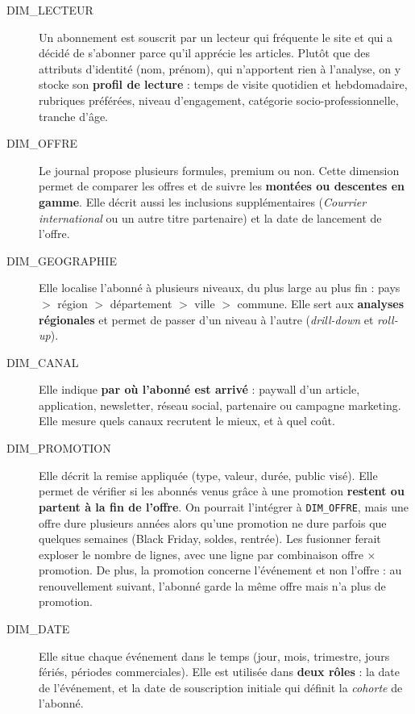\documentclass[a4paper,12pt]{article}
\begin{document}
\begin{description}

  \item[DIM\_LECTEUR] Un abonnement est souscrit par un lecteur qui fréquente
  le site et qui a décidé de s'abonner parce qu'il apprécie les articles.
  Plutôt que des attributs d'identité (nom, prénom), qui n'apportent rien à
  l'analyse, on y stocke son \textbf{profil de lecture} : temps de visite
  quotidien et hebdomadaire, rubriques préférées, niveau d'engagement,
  catégorie socio-professionnelle, tranche d'âge.

  \item[DIM\_OFFRE] Le journal propose plusieurs formules, premium ou non.
  Cette dimension permet de comparer les offres et de suivre les
  \textbf{montées ou descentes en gamme}. Elle décrit aussi les inclusions
  supplémentaires (\emph{Courrier international} ou un autre titre partenaire)
  et la date de lancement de l'offre.

  \item[DIM\_GEOGRAPHIE] Elle localise l'abonné à plusieurs niveaux, du plus
  large au plus fin : pays $>$ région $>$ département $>$ ville $>$ commune.
  Elle sert aux \textbf{analyses régionales} et permet de passer d'un niveau
  à l'autre (\emph{drill-down} et \emph{roll-up}).

  \item[DIM\_CANAL] Elle indique \textbf{par où l'abonné est arrivé} :
  paywall d'un article, application, newsletter, réseau social, partenaire
  ou campagne marketing. Elle mesure quels canaux recrutent le mieux,
  et à quel coût.

  \item[DIM\_PROMOTION] Elle décrit la remise appliquée (type, valeur, durée,
  public visé). Elle permet de vérifier si les abonnés venus grâce à une
  promotion \textbf{restent ou partent à la fin de l'offre}.
  On pourrait l'intégrer à \texttt{DIM\_OFFRE}, mais une offre dure plusieurs
  années alors qu'une promotion ne dure parfois que quelques semaines
  (Black Friday, soldes, rentrée). Les fusionner ferait exploser le nombre
  de lignes, avec une ligne par combinaison offre $\times$ promotion.
  De plus, la promotion concerne l'événement et non l'offre : au
  renouvellement suivant, l'abonné garde la même offre mais n'a plus de
  promotion.

  \item[DIM\_DATE] Elle situe chaque événement dans le temps (jour, mois,
  trimestre, jours fériés, périodes commerciales). Elle est utilisée dans
  \textbf{deux rôles} : la date de l'événement, et la date de souscription
  initiale qui définit la \emph{cohorte} de l'abonné.


\end{description}
\end{document}
